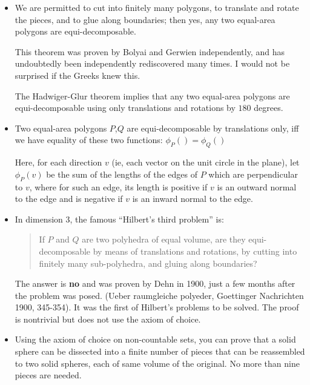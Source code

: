 \begin{itemize}
\item We are permitted to cut into finitely many polygons, to translate
        and rotate the pieces, and to glue along boundaries;
        then yes, any two equal-area polygons are equi-decomposable.

        This theorem was proven by Bolyai and Gerwien independently, and has
        undoubtedly been independently rediscovered many times.  I would not
        be surprised if the Greeks knew this.

        The Hadwiger-Glur theorem implies that any two equal-area polygons are
        equi-decomposable using only translations and rotations by $180$
        degrees.

     \item \begin{teo}  Two equal-area polygons $P$,$Q$ are
        equi-decomposable by translations only, iff we have equality of these
        two functions:     $\phi_P() = \phi_Q()$
     \end{teo}
        Here, for each direction $v$ (ie, each vector on the unit circle in the
        plane), let $\phi_P(v)$ be the sum of the lengths of the edges of $P$
         which
        are perpendicular to $v$, where for such an edge, its length is positive
        if $v$ is an outward normal to the edge and is negative if $v$ is an
        inward normal to the edge.


     \item In dimension 3, the famous ``Hilbert's third problem'' is:
\begin{quote}
       If $P$ and $Q$ are two polyhedra of equal volume, are they
        equi-decomposable by means of translations and rotations, by
        cutting into finitely many sub-polyhedra, and gluing along
        boundaries?
\end{quote}

        The answer is {\bf no} and was proven by Dehn in 1900, just a few months
        after the problem was posed. (Ueber raumgleiche polyeder, Goettinger
        Nachrichten 1900, 345-354). It was the first of Hilbert's problems
        to be solved. The proof is nontrivial but does not use the axiom
        of choice.

\Ref



     \item Using the axiom of choice on non-countable sets, you can prove
        that a solid sphere can be dissected into a finite number of
        pieces that can be reassembled to two solid spheres, each of
        same volume of the original. No more than nine pieces are needed.


\end{itemize}
